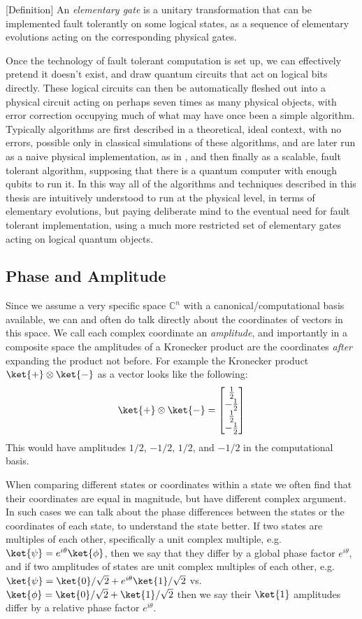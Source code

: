 [Definition] An \emph{elementary gate} is a unitary transformation that can be implemented fault tolerantly on some logical states, as a sequence of elementary evolutions acting on the corresponding physical gates.

Once the technology of fault tolerant computation is set up, we can effectively pretend it doesn't exist, and draw quantum circuits that act on logical bits directly. These logical circuits can then be automatically fleshed out into a physical circuit acting on perhaps seven times as many physical objects, with error correction occupying much of what may have once been a simple algorithm. Typically algorithms are first described in a theoretical, ideal context, with no errors, possible only in classical simulations of these algorithms, and are later run as a naive physical implementation, as in \cite{algos}, and then finally as a scalable, fault tolerant algorithm, supposing that there is a quantum computer with enough qubits to run it. In this way all of the algorithms and techniques described in this thesis are intuitively understood to run at the physical level, in terms of elementary evolutions, but paying deliberate mind to the eventual need for fault tolerant implementation, using a much more restricted set of elementary gates acting on logical quantum objects.

\subsection{Phase and Amplitude}
Since we assume a very specific space $\mathbb{C}^n$ with a canonical/computational basis available, we can and often do talk directly about the coordinates of vectors in this space. We call each complex coordinate an \emph{amplitude}, and importantly in a composite space the amplitudes of a Kronecker product are the coordinates \emph{after} expanding the product not before. For example the Kronecker product $\ket{+} \otimes \ket{-}$ as a vector looks like the following:
\[\ket{+} \otimes \ket{-} = \left[\begin{matrix}
\frac{1}{2} \\
-\frac{1}{2} \\
\frac{1}{2} \\
-\frac{1}{2} \\
\end{matrix}\right]\]
This would have amplitudes $1/2$, $-1/2$, $1/2$, and $-1/2$ in the computational basis.

When comparing different states or coordinates within a state we often find that their coordinates are equal in magnitude, but have different complex argument. In such cases we can talk about the phase differences between the states or the coordinates of each state, to understand the state better. If two states are multiples of each other, specifically a unit complex multiple, e.g.\ $\ket{\psi} = e^{i\theta}\ket{\phi}$, then we say that they differ by a global phase factor $e^{i\theta}$, and if two amplitudes of states are unit complex multiples of each other, e.g. $\ket{\psi} = \ket{0}/\sqrt{2} + e^{i\theta}\ket{1}/\sqrt{2}$ vs. $\ket{\phi} = \ket{0}/\sqrt{2} + \ket{1}/\sqrt{2}$ then we say their $\ket{1}$ amplitudes differ by a relative phase factor $e^{i\theta}$.

